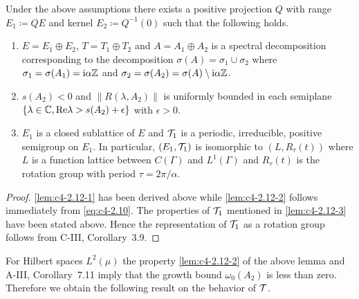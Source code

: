 \begin{lemma}\label{lem:c4-2.12}
%
%
%
Under the above assumptions there exists a positive projection $Q$ with range $E_{1} \coloneqq QE$ and kernel $E_{2} \coloneqq Q^{-1}(0)$ such that the following holds.
\begin{enumerate}[\upshape (i)]
\item \label{lem:c4-2.12-1}
$E = E_{1} \oplus E_{2}$, $T = T_{1} \oplus T_{2}$ and $A = A_{1} \oplus A_{2}$ is a spectral decomposition corresponding to the decomposition $\sigma(A) = \sigma_{1} \cup \sigma_{2}$ where $\sigma_{1} = \sigma(A_{1}) = \mathrm{i}\alpha\mathbb{Z}$ and $\sigma_{2} = \sigma(A_{2}) = \sigma(A) \setminus \mathrm{i}\alpha\mathbb{Z}$.

\item \label{lem:c4-2.12-2}
$s(A_{2}) < 0$ and $\|R(\lambda,A_{2})\|$ is uniformly bounded in each semiplane\\ 
$\{\lambda \in \mathbb{C}, \mathop{}\!\mathrm{Re} \lambda > s(A_{2}) + \epsilon\}$ with $\epsilon > 0$.

\item \label{lem:c4-2.12-3}
$E_{1}$ is a closed sublattice of $E$ and $\mathcal{T}_{1}$ is a periodic, irreducible, positive semigroup on $E_{1}$.
In particular, $(E_{1},\mathcal{T}_{1})$ is isomorphic to $(L,R_{\tau}(t))$ where $L$ is a function lattice between $C(\Gamma)$ and $L^{1}(\Gamma)$ and $R_{\tau}(t)$ is the rotation group with period $\tau = 2\pi/\alpha$.
\end{enumerate}
\end{lemma}
\begin{proof}
\ref{lem:c4-2.12-1} has been derived above while \ref{lem:c4-2.12-2} follows immediately from \eqref{eq:c4-2.10}.
The properties of $\mathcal{T}_{1}$ mentioned in \ref{lem:c4-2.12-3} have been stated above.
Hence the representation of $\mathcal{T}_{1}$ as a rotation group follows from C-III, Corollary~3.9.
\end{proof}
For Hilbert spaces $L^{2}(\mu)$ the property \ref{lem:c4-2.12-2} of the above lemma and A-III, Corollary~7.11 imply that the growth bound $\omega_{0}(A_{2})$ is less than zero.
Therefore we obtain the following result on the behavior of $\mathcal{T}$.

